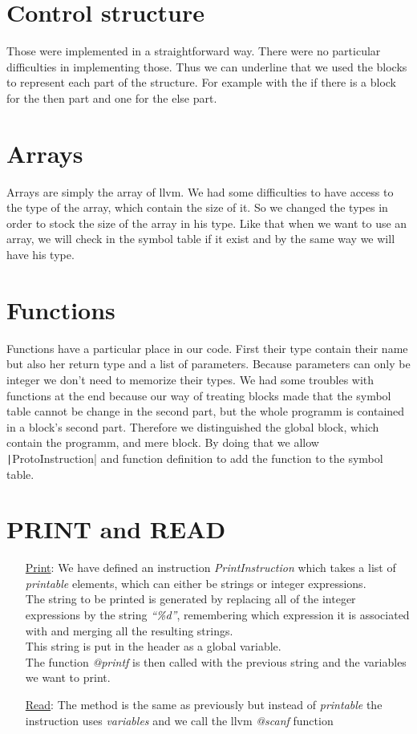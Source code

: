 \documentclass{article}
\newcommand{\code}[1]{\texttt|#1|}
\begin{document}
\section{Control structure}

Those were implemented in a straightforward way. There were no particular difficulties in implementing those. Thus we can underline that we used the blocks to represent each part of the structure. For example with the if there is a block for the then part and one for the else part. 

\section{Arrays}

Arrays are simply the array of llvm. We had some difficulties to have access to the type of the array, which contain the size of it. So we changed the types in order to stock the size of the array in his type. Like that when we want to use an array, we will check in the symbol table if it exist and by the same way we will have his type. 

\section{Functions}

Functions have a particular place in our code. First their type contain their name but also her return type and a list of parameters. Because parameters can only be integer we don't need to memorize their types. We had some troubles with functions at the end because our way of treating blocks made that the symbol table cannot be change in the second part, but the whole programm is contained in a block's second part. Therefore we distinguished the global block, which contain the programm, and mere block. By doing that we allow \code{ProtoInstruction} and function definition to add the function to the symbol table. 

\section{PRINT and READ}

\begin{itemize}
\item[\underline{Print}:] We have defined an instruction \emph{PrintInstruction}
  which takes a list of \emph{printable} elements, which can either be strings or integer expressions. \\
  The string to be printed is generated by replacing all of the integer expressions by the
  string \emph{``\%d''}, remembering which expression it is associated with and merging all the resulting strings. \\
  This string is put in the header as a global variable. \\
  The function \emph{@printf} is then called with the previous string and the variables we want to print. 
\item[\underline{Read}:] The method is the same as previously but instead of
  \emph{printable} the instruction uses \emph{variables} and we call the llvm \emph{@scanf} function
\end{itemize}
\end{document}
